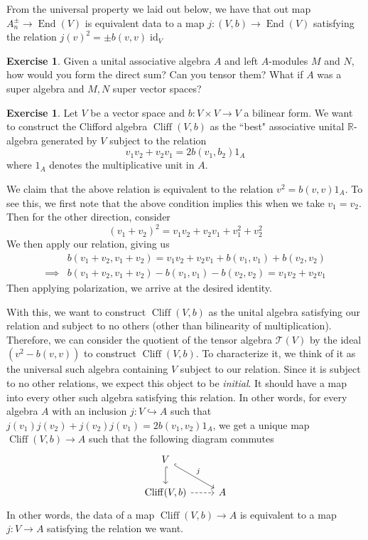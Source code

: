 \documentclass[psamsfonts]{amsart}
\theoremstyle{definition}
\newtheorem{exer}[thm]{Exercise}
\theoremstyle{remark}
\newcommand{\R}{\mathbb{R}}
\DeclareMathOperator{\id}{id}
\DeclareMathOperator{\End}{End}
\DeclareMathOperator{\Cliff}{Cliff}
\begin{document}
From the universal property we laid out below, we have that out map $A^\pm_n \to \End(V)$ is equivalent data to a map $j: (V, b) \to \End(V)$ satisfying the relation $j(v)^2 = \pm b(v,v)\id_V$
%
\begin{exer}
Given a unital associative algebra $A$ and left $A$-modules $M$ and $N$, how would you form the direct sum? Can you tensor them? What if $A$ was a super algebra and $M,N$ super vector spaces?
\end{exer}
%
\begin{exer}
Let $V$ be a vector space and $b : V \times V \to V$ a bilinear form. We want to construct the Clifford algebra $\Cliff(V,b)$ as the ``best" associative unital $\R$-algebra generated by $V$ subject to the relation 
$$v_1v_2 + v_2v_1 = 2b(v_1,b_2)1_A$$
where $1_A$ denotes the multiplicative unit in $A$.
\end{exer}
We claim that the above relation is equivalent to the relation $v^2 = b(v,v)1_A$. To see this, we first note that the above condition implies this when we take $v_1 = v_2$. Then for the other direction, consider
$$(v_1 + v_2)^2 = v_1v_2 + v_2v_1 + v_1^2 + v_2^2$$
We then apply our relation, giving us
\begin{align*}
&b(v_1 + v_2, v_1 + v_2) = v_1v_2 + v_2v_1 + b(v_1,v_1) + b(v_2,v_2) \\
\implies & b(v_1 + v_2, v_1 + v_2) - b(v_1, v_1) - b(v_2, v_2) = v_1v_2 + v_2v_1
\end{align*}
Then applying polarization, we arrive at the desired identity.

With this, we want to construct $\Cliff(V,b)$ as the unital algebra satisfying our relation and subject to no others (other than bilinearity of multiplication). Therefore, we can consider the quotient of the tensor algebra $\mathcal{T}(V)$ by the ideal $(v^2 - b(v,v))$ to construct $\Cliff(V,b)$. To characterize it, we think of it as the universal such algebra containing $V$ subject to our relation. Since it is subject to no other relations, we expect this object to be \emph{initial}. It should have a map into every other such algebra satisfying this relation. In other words, for every algebra $A$ with an inclusion $j : V \hookrightarrow A$ such that $j(v_1)j(v_2) + j(v_2)j(v_1) = 2b(v_1,v_2)1_A$, we get a unique map $\Cliff(V,b) \to A$ such that the following diagram commutes
$$\begin{tikzcd}
V \arrow[hookrightarrow]{d} \arrow[hookrightarrow]{dr}{ j} \\
\Cliff(V,b) \arrow[dashed]{r} & A
\end{tikzcd}$$
In other words, the data of a map $\Cliff(V,b) \to A$ is equivalent to a map $j : V \to A$ satisfying the relation we want.
\end{document}
